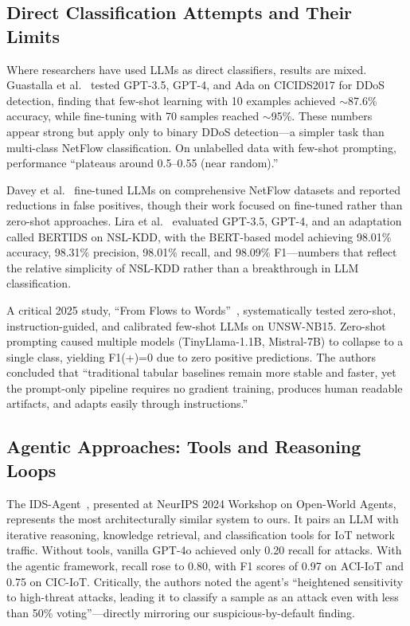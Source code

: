 \documentclass[12pt, a4paper, oneside]{report}
\begin{document}
\subsection{Direct Classification Attempts and Their Limits}

Where researchers have used LLMs as direct classifiers, results are mixed.
Guastalla et al.~\cite{guastalla2024ddos} tested GPT-3.5, GPT-4, and Ada on
CICIDS2017 for DDoS detection, finding that few-shot learning with 10 examples
achieved $\sim$87.6\% accuracy, while fine-tuning with 70 samples reached
$\sim$95\%. These numbers appear strong but apply only to binary DDoS
detection---a simpler task than multi-class NetFlow classification. On unlabelled
data with few-shot prompting, performance ``plateaus around 0.5--0.55 (near
random).''

Davey et al.~\cite{davey2025llmnids} fine-tuned LLMs on comprehensive NetFlow
datasets and reported reductions in false positives, though their work focused on
fine-tuned rather than zero-shot approaches. Lira et al.~\cite{lira2024bertids}
evaluated GPT-3.5, GPT-4, and an adaptation called BERTIDS on NSL-KDD, with the
BERT-based model achieving 98.01\% accuracy, 98.31\% precision, 98.01\% recall,
and 98.09\% F1---numbers that reflect the relative simplicity of NSL-KDD rather
than a breakthrough in LLM classification.

A critical 2025 study, ``From Flows to Words''~\cite{flows2words2025},
systematically tested zero-shot, instruction-guided, and calibrated few-shot LLMs
on UNSW-NB15. Zero-shot prompting caused multiple models (TinyLlama-1.1B,
Mistral-7B) to collapse to a single class, yielding F1(+)=0 due to zero positive
predictions. The authors concluded that ``traditional tabular baselines remain more
stable and faster, yet the prompt-only pipeline requires no gradient training,
produces human readable artifacts, and adapts easily through instructions.''

\subsection{Agentic Approaches: Tools and Reasoning Loops}

The IDS-Agent~\cite{li2024idsagent}, presented at NeurIPS 2024 Workshop on
Open-World Agents, represents the most architecturally similar system to ours. It
pairs an LLM with iterative reasoning, knowledge retrieval, and classification
tools for IoT network traffic. Without tools, vanilla GPT-4o achieved only 0.20
recall for attacks. With the agentic framework, recall rose to 0.80, with F1 scores
of 0.97 on ACI-IoT and 0.75 on CIC-IoT. Critically, the authors noted the agent's
``heightened sensitivity to high-threat attacks, leading it to classify a sample
as an attack even with less than 50\% voting''---directly mirroring our
suspicious-by-default finding.
\end{document}
